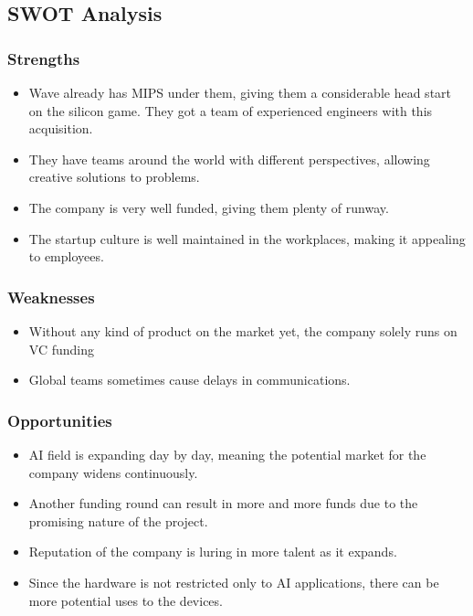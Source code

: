 \newpage
\subsection{SWOT Analysis}

\subsubsection*{Strengths}

\begin{itemize}
    \item Wave already has MIPS under them, giving them a considerable head start on the silicon game. They got a team of experienced engineers with this acquisition.
    \item They have teams around the world with different perspectives, allowing creative solutions to problems.
    \item The company is very well funded, giving them plenty of runway.
    \item The startup culture is well maintained in the workplaces, making it appealing to employees.
\end{itemize}


\subsubsection*{Weaknesses}
\begin{itemize}
    \item Without any kind of product on the market yet, the company solely runs on VC funding
    \item Global teams sometimes cause delays in communications.
\end{itemize}


\subsubsection*{Opportunities}
\begin{itemize}
    \item AI field is expanding day by day, meaning the potential market for the company widens continuously.
    \item Another funding round can result in more and more funds due to the promising nature of the project.
    \item Reputation of the company is luring in more talent as it expands.
    \item Since the hardware is not restricted only to AI applications, there can be more potential uses to the devices.
\end{itemize}

